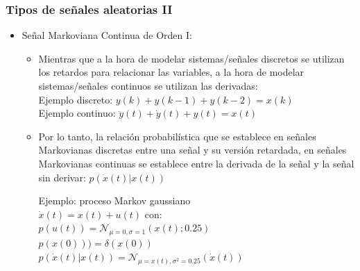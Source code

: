 \documentclass{beamer}
\numberwithin{section}{part}
\begin{document}
\begin{frame}
  \frametitle{Tipos de señales aleatorias II}
  \footnotesize

  \begin{itemize}
    \item \alert{Señal Markoviana Continua de Orden I: }
    \begin{itemize}
      \footnotesize
      \item Mientras que a la hora de modelar sistemas/señales discretos se utilizan los retardos para relacionar las variables, a la hora de modelar sistemas/señales continuos se utilizan las derivadas:
      \vspace{0.1cm}
      {\\\color{olivegreen}
      \hspace{0.5cm}Ejemplo discreto: $y(k)+y(k-1)+y(k-2)=x(k)$
      \vspace{0.1cm}
      \\
      \hspace{0.5cm}Ejemplo continuo: $\ddot y(t)+ \dot y(t) +y(t)=x(t)$
      \vspace{0.1cm}
      \color{black}}
      \item Por lo tanto, la relación probabilística que se establece en señales Markovianas discretas entre una señal y su versión retardada, en señales Markovianas continuas se establece entre la derivada de la señal y la señal sin derivar:
        $p(\dot x(t)|x(t))$

      \vspace{0.1cm}
      \hspace{0.5cm}\color{olivegreen}Ejemplo: proceso Markov gaussiano \color{gray}\\
      \vspace{0.1cm}
      \hspace{1.0cm}$\dot x(t)\!=\!x(t)\!+\!u(t)$ con:\\
      \scriptsize
      \vspace{0.1cm}
      \hspace{1.5cm}$p(u(t))=\mathcal{N}_{\mu=0,\sigma=1}(x(t);0.25)$\\
      \vspace{0.1cm}
      \hspace{1.5cm}$p(x(0)))=\delta(x(0))$\\
      \vspace{0.2cm}
      \hspace{0.8cm}$p(\dot x(t)|x(t))\!=\!\mathcal{N}_{\mu=x(t),\sigma^2=0.25}(\dot x(t))$
    \end{itemize}
  \end{itemize}

\end{frame}
\end{document}
